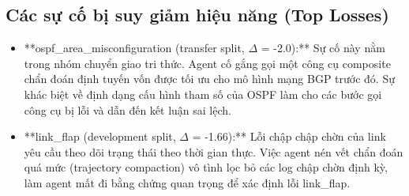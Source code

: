 \subsection{Các sự cố bị suy giảm hiệu năng (Top Losses)}
\begin{itemize}
    \item **ospf\_area\_misconfiguration (transfer split, $\Delta$ = -2.0):** Sự cố này nằm trong nhóm chuyển giao tri thức. Agent cố gắng gọi một công cụ composite chẩn đoán định tuyến vốn được tối ưu cho mô hình mạng BGP trước đó. Sự khác biệt về định dạng cấu hình tham số của OSPF làm cho các bước gọi công cụ bị lỗi và dẫn đến kết luận sai lệch.
    \item **link\_flap (development split, $\Delta$ = -1.66):** Lỗi chập chập chờn của link yêu cầu theo dõi trạng thái theo thời gian thực. Việc agent nén vết chẩn đoán quá mức (trajectory compaction) vô tình lọc bỏ các log chập chờn định kỳ, làm agent mất đi bằng chứng quan trọng để xác định lỗi link\_flap.
\end{itemize}
